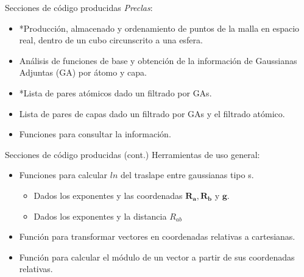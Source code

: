\documentclass[dvisvgm,11pt,aspectratio=169]{beamer}
\begin{document}
\begin{frame}{Secciones de código producidas}
	\textit{Preclas}:
			\begin{itemize}
				\item *Producción, almacenado y ordenamiento de puntos de la malla en espacio real, dentro de un cubo circunscrito a una esfera.
				\item Análisis de funciones de base y obtención de la información de Gaussianas Adjuntas (GA) por átomo y capa.
				\item *Lista de pares atómicos dado un filtrado por GAs.
				\item Lista de pares de capas dado un filtrado por GAs y el filtrado atómico.
				\item Funciones para consultar la información.
			\end{itemize}
\end{frame}

\begin{frame}{Secciones de código producidas (cont.)}
	Herramientas de uso general:
		\begin{itemize}
			\item Funciones para calcular $ln$ del traslape entre gaussianas tipo s.
			\begin{itemize}
				\item Dados los exponentes y las coordenadas $\mathbf{R_a, R_b}$ y $\mathbf{g}$.
				\item Dados los exponentes y la distancia $R_{ab}$
			\end{itemize}
			\item Función para transformar vectores en coordenadas relativas a cartesianas.
			\item Función para calcular el módulo de un vector a partir de sus coordenadas relativas.
		\end{itemize}
\end{frame}
\end{document}
